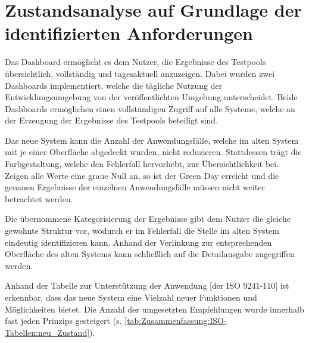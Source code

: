 \section{Zustandsanalyse auf Grundlage der identifizierten Anforderungen}
\label{ch:Dashboard:sec:Anforderungen_Auswertung}

Das Dash\-board ermöglicht es dem Nutzer, die Ergebnisse des Testpools übersichtlich, vollständig und tagesaktuell anzuzeigen. Dabei wurden zwei Dash\-boards implementiert, welche die tägliche Nutzung der Entwicklungsumgebung von der veröffentlichten Umgebung unterscheidet. Beide Dash\-boards ermöglichen einen vollständigen Zugriff auf alle Systeme, welche an der Erzeugung der Ergebnisse des Testpools beteiligt sind.

Das neue System kann die Anzahl der Anwendungsfälle, welche im alten System mit je einer Oberfläche abgedeckt wurden, nicht reduzieren. Stattdessen trägt die Farbgestaltung, welche den Fehlerfall hervorhebt, zur Übersichtlichkeit bei. Zeigen alle Werte eine graue Null an, so ist der Green Day erreicht und die genauen Ergebnisse der einzelnen Anwendungsfälle müssen nicht weiter betrachtet werden.

Die übernommene Kategorisierung der Ergebnisse gibt dem Nutzer die gleiche gewohnte Struktur vor, wodurch er im Fehlerfall die Stelle im alten System eindeutig identifizieren kann. Anhand der Verlinkung zur entsprechenden Oberfläche des alten Systems kann schließlich auf die Detailausgabe zugegriffen werden.

Anhand der \glqq Tabelle zur Unterstützung der Anwendung [der ISO 9241-110]\grqq{} \cite{DIN_EN_ISO_9241-110} ist erkennbar, dass das neue System eine Vielzahl neuer Funktionen und Möglichkeiten bietet. Die Anzahl der umgesetzten Empfehlungen wurde innerhalb fast jeden Prinzips gesteigert (s. \autoref{tab:Zusammenfassung:ISO-Tabellen:neu_Zustand}). %

